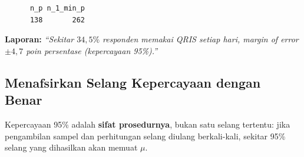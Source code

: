 \documentclass[
  indonesian,
  letterpaper,
]{book}
\begin{document}
\begin{verbatim}
      n_p n_1_min_p 
      138       262 
\end{verbatim}

\textbf{Laporan:} \emph{``Sekitar \(34{,}5\%\) responden memakai QRIS
setiap hari, margin of error \(\pm 4{,}7\) poin persentase (kepercayaan
95\%).''}

\subsection{Menafsirkan Selang Kepercayaan dengan
Benar}\label{menafsirkan-selang-kepercayaan-dengan-benar}

Kepercayaan 95\% adalah \textbf{sifat prosedurnya}, bukan satu selang
tertentu: jika pengambilan sampel dan perhitungan selang diulang
berkali-kali, sekitar 95\% selang yang dihasilkan akan memuat \(\mu\).
\end{document}
